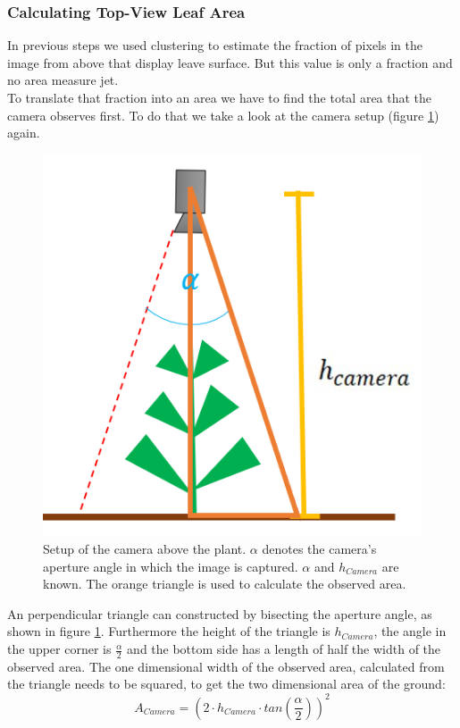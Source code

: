 \graphicspath{{members/tf/figures/}}

\subsubsection{Calculating Top-View Leaf Area}


In previous steps we used clustering to estimate the fraction of pixels in the image from above that display leave surface. But this value is only a fraction and no area measure jet.\\
To translate that fraction into an area we have to find the total area that the camera observes first. To do that we take a look at the camera setup (figure \ref{fig:setupAbove}) again.
   \begin{figure}[H]
       \centering
       \includegraphics[scale=0.6]{setupAbove.PNG}
       \caption{Setup of the camera above the plant. $\alpha$ denotes the camera's aperture angle in which the image is captured. $\alpha$ and $h_{Camera}$ are known. The orange triangle is used to calculate the observed area.}
       \label{fig:setupAbove}
   \end{figure}
An perpendicular triangle can constructed by bisecting the aperture angle, as shown in figure \ref{fig:setupAbove}.
Furthermore the height of the triangle is $h_{Camera}$, the angle in the upper corner is $\frac{\alpha}{2}$ and the bottom side has a length of half the width of the observed area. The one dimensional width of the observed area, calculated from the triangle needs to be squared, to get the two dimensional area of the ground:
$$A_{Camera} = (2\cdot h_{Camera}\cdot tan(\frac{\alpha}{2}))^2$$

